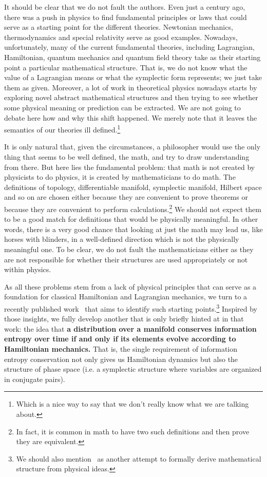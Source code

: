 \documentclass[11pt]{elsarticle}
\begin{document}
It should be clear that we do not fault the authors. Even just a century ago, there was a push in physics to find fundamental principles or laws that could serve as a starting point for the different theories. Newtonian mechanics, thermodynamics and special relativity serve as good examples. Nowadays, unfortunately, many of the current fundamental theories, including Lagrangian, Hamiltonian, quantum mechanics and quantum field theory take as their starting point a particular mathematical structure. That is, we do not know what the value of a Lagrangian means or what the symplectic form represents; we just take them as given. Moreover, a lot of work in theoretical physics nowadays starts by exploring novel abstract mathematical structures and then trying to see whether some physical meaning or prediction can be extracted. We are not going to debate here how and why this shift happened. We merely note that it leaves the semantics of our theories ill defined.\footnote{Which is a nice way to say that we don't really know what we are talking about.} 

It is only natural that, given the circumstances, a philosopher would use the only thing that seems to be well defined, the math, and try to draw understanding from there. But here lies the fundamental problem: that math is not created by physicists to do physics, it is created by mathematicians to do math. The definitions of topology, differentiable manifold, symplectic manifold, Hilbert space and so on are chosen either because they are convenient to prove theorems or because they are convenient to perform calculations.\footnote{In fact, it is common in math to have two such definitions and then prove they are equivalent.} We should not expect them to be a good match for definitions that would be physically meaningful. In other words, there is a very good chance that looking at just the math may lead us, like horses with blinders, in a well-defined direction which is not the physically meaningful one. To be clear, we do not fault the mathematicians either as they are not responsible for whether their structures are used appropriately or not within physics.

As all these problems stem from a lack of physical principles that can serve as a foundation for classical Hamiltonian and Lagrangian mechanics, we turn to a recently published work~\cite{AoPPhy1} that aims to identify such starting points.\footnote{We should also mention~\cite{Maudlin} as another attempt to formally derive mathematical structure from physical ideas.} Inspired by those insights, we fully develop another that is only briefly hinted at in that work: the idea that \textbf{a distribution over a manifold conserves information entropy over time if and only if its elements evolve according to Hamiltonian mechanics.} That is, the single requirement of information entropy conservation not only gives us Hamiltonian dynamics but also the structure of phase space (i.e. a symplectic structure where variables are organized in conjugate pairs).
\end{document}
